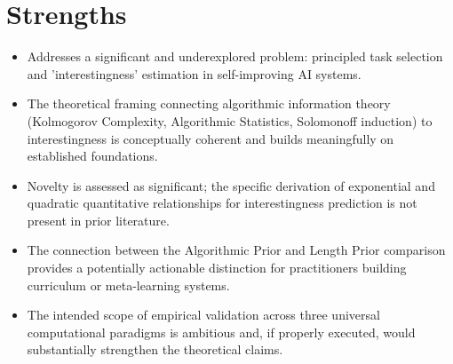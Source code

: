 \documentclass[11pt]{article}
\begin{document}
\section*{Strengths}
\begin{itemize}[leftmargin=*]
  \item Addresses a significant and underexplored problem: principled task selection and 'interestingness' estimation in self-improving AI systems.
  \item The theoretical framing connecting algorithmic information theory (Kolmogorov Complexity, Algorithmic Statistics, Solomonoff induction) to interestingness is conceptually coherent and builds meaningfully on established foundations.
  \item Novelty is assessed as significant; the specific derivation of exponential and quadratic quantitative relationships for interestingness prediction is not present in prior literature.
  \item The connection between the Algorithmic Prior and Length Prior comparison provides a potentially actionable distinction for practitioners building curriculum or meta-learning systems.
  \item The intended scope of empirical validation across three universal computational paradigms is ambitious and, if properly executed, would substantially strengthen the theoretical claims.
\end{itemize}
\end{document}
